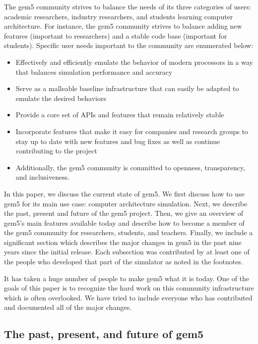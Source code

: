 The gem5 community strives to balance the needs of its three categories of users: academic researchers, industry researchers, and students learning computer architecture.
For instance, the gem5 community strives to balance adding new features (important to researchers) and a stable code base (important for students).
Specific user needs important to the community are enumerated below:
\begin{itemize}
    \item Effectively and efficiently emulate the behavior of modern processors in a way that balances simulation performance and accuracy
    \item Serve as a malleable baseline infrastructure that can easily be adapted to emulate the desired behaviors
    \item Provide a core set of APIs and features that remain relatively stable
    \item Incorporate features that make it easy for companies and research groups to stay up to date with new features and bug fixes as well as continue contributing to the project
    \item Additionally, the gem5 community is committed to openness, transparency, and inclusiveness.
\end{itemize}

In this paper, we discuss the current state of gem5.
We first discuss how to use gem5 for its main use case: computer architecture simulation.
Next, we describe the past, present and future of the gem5 project.
Then, we give an overview of gem5's main features available today and describe how to become a member of the gem5 community for researchers, students, and teachers.
Finally, we include a significant section which describes the major changes in gem5 in the past nine years since the initial release.
Each subsection was contributed by at least one of the people who developed that part of the simulator as noted in the footnotes.

It has taken a huge number of people to make gem5 what it is today.
One of the goals of this paper is to recognize the hard work on this community infrastructure which is often overlooked.
We have tried to include everyone who has contributed and documented all of the major changes.

\subsection{The past, present, and future of gem5}\label{sec:current-gem5}

